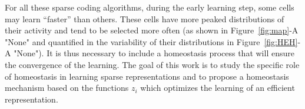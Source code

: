 \documentclass[vision,article,submit,oneauthor,pdftex]{Definitions/mdpi}
\begin{document}
For all these sparse coding algorithms, during the early learning step, some cells may learn ``faster'' than others. These cells have more peaked distributions of their activity and tend to be selected more often (as shown in Figure~\ref{fig:map}-A "None" and quantified in the variability of their distributions in Figure~\ref{fig:HEH}-A "None"). It is thus necessary to include a homeostasis process that will ensure the convergence of the learning. The goal of this work is to study the specific role of homeostasis in learning sparse representations and to propose a homeostasis mechanism based on the functions $z_i$ which optimizes the learning of an efficient representation.%
\end{document}
